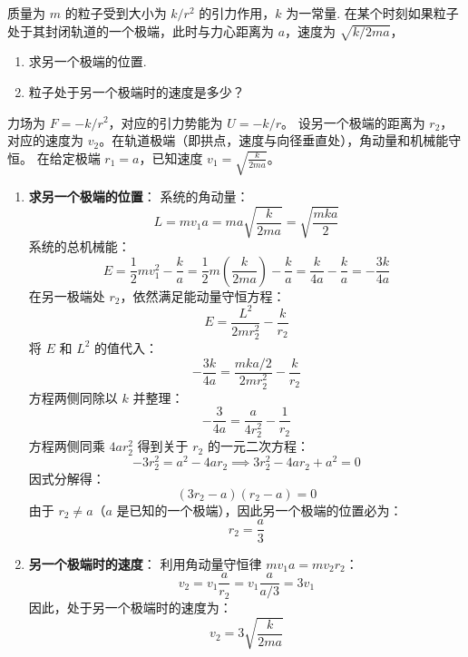 \begin{exercise}\label{ex:4.12}
质量为 $m$ 的粒子受到大小为 $k/r^2$ 的引力作用，$k$ 为一常量. 在某个时刻如果粒子处于其封闭轨道的一个极端，此时与力心距离为 $a$，速度为 $\sqrt{k/2ma}$，
\begin{enumerate}
  \item[(a)] 求另一个极端的位置.
  \item[(b)] 粒子处于另一个极端时的速度是多少？
\end{enumerate}
\end{exercise}
\begin{solution}
力场为 $F = -k/r^2$，对应的引力势能为 $U = -k/r$。
设另一个极端的距离为 $r_2$，对应的速度为 $v_2$。在轨道极端（即拱点，速度与向径垂直处），角动量和机械能守恒。
在给定极端 $r_1 = a$，已知速度 $v_1 = \sqrt{\frac{k}{2ma}}$。

\begin{enumerate}
    \item[(a)] \textbf{求另一个极端的位置}：
    系统的角动量：
    $$ L = m v_1 a = m a \sqrt{\frac{k}{2ma}} = \sqrt{\frac{mka}{2}} $$
    系统的总机械能：
    $$ E = \frac{1}{2}m v_1^2 - \frac{k}{a} = \frac{1}{2}m \left( \frac{k}{2ma} \right) - \frac{k}{a} = \frac{k}{4a} - \frac{k}{a} = -\frac{3k}{4a} $$
    在另一极端处 $r_2$，依然满足能动量守恒方程：
    $$ E = \frac{L^2}{2m r_2^2} - \frac{k}{r_2} $$
    将 $E$ 和 $L^2$ 的值代入：
    $$ -\frac{3k}{4a} = \frac{mka/2}{2m r_2^2} - \frac{k}{r_2} $$
    方程两侧同除以 $k$ 并整理：
    $$ -\frac{3}{4a} = \frac{a}{4r_2^2} - \frac{1}{r_2} $$
    方程两侧同乘 $4a r_2^2$ 得到关于 $r_2$ 的一元二次方程：
    $$ -3r_2^2 = a^2 - 4a r_2 \implies 3r_2^2 - 4a r_2 + a^2 = 0 $$
    因式分解得：
    $$ (3r_2 - a)(r_2 - a) = 0 $$
    由于 $r_2 \neq a$（$a$ 是已知的一个极端），因此另一个极端的位置必为：
    $$ r_2 = \frac{a}{3} $$

    \item[(b)] \textbf{另一个极端时的速度}：
    利用角动量守恒律 $m v_1 a = m v_2 r_2$：
    $$ v_2 = v_1 \frac{a}{r_2} = v_1 \frac{a}{a/3} = 3 v_1 $$
    因此，处于另一个极端时的速度为：
    $$ v_2 = 3\sqrt{\frac{k}{2ma}} $$
\end{enumerate}
\end{solution}

